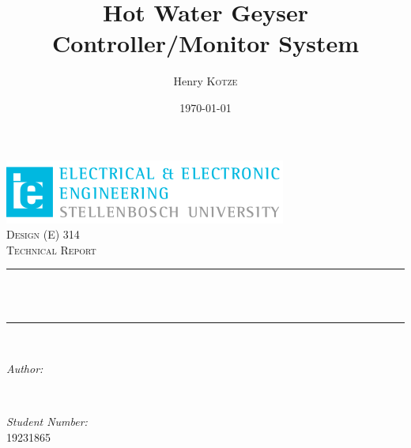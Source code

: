 \documentclass[11pt,a4paper]{article}
\title{Hot Water Geyser Controller/Monitor System} %
\author{Henry \textsc{Kotze}} %
\date{\today} %
\makeatletter
\let\thetitle\@title
\let\theauthor\@author
\let\thedate\@date
\makeatother
\begin{document}
\begin{titlepage}
    \centering
    \vspace*{0.5 cm}
    \includegraphics[scale = 2]{EELogo.png}\\[1.0 cm]   %
    \textsc{\LARGE Design (E) 314 \\ Technical Report}\\[0.5 cm]               %
    \rule{\linewidth}{0.2 mm} \\[0.4 cm]
    { \huge \bfseries \thetitle }\\[0.4 cm]
    \rule{\linewidth}{0.2 mm} \\[1.5 cm]
    
	\begin{minipage}{6.5cm}
		\begin{flushleft} \large
			\emph{Author:}\\
			\theauthor
		\end{flushleft}
	\end{minipage}~
	\begin{minipage}{6.5cm}
		\begin{flushright} \large
			\emph{Student Number:} \\
			19231865                                   %
		\end{flushright}
	\end{minipage}\\[2 cm]
    
    {\large \thedate}\\[2 cm]
 
    \vfill
    
\end{titlepage}
\end{document}
